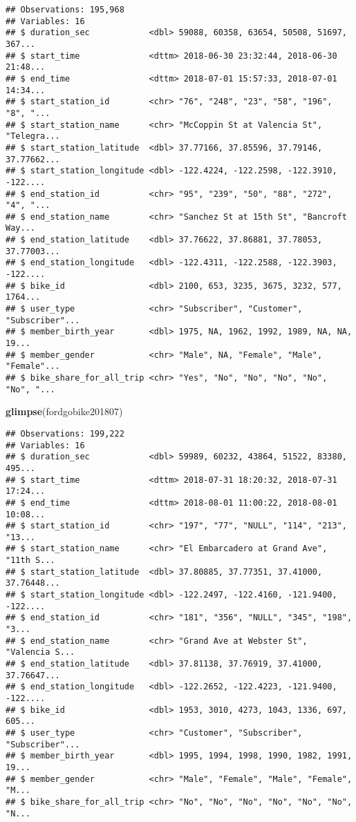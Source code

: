 \documentclass[]{article}
\newenvironment{Shaded}{\begin{snugshade}}{\end{snugshade}}
\newcommand{\KeywordTok}[1]{\textcolor[rgb]{0.13,0.29,0.53}{\textbf{#1}}}
\newcommand{\NormalTok}[1]{#1}
\begin{document}
\begin{verbatim}
## Observations: 195,968
## Variables: 16
## $ duration_sec            <dbl> 59088, 60358, 63654, 50508, 51697, 367...
## $ start_time              <dttm> 2018-06-30 23:32:44, 2018-06-30 21:48...
## $ end_time                <dttm> 2018-07-01 15:57:33, 2018-07-01 14:34...
## $ start_station_id        <chr> "76", "248", "23", "58", "196", "8", "...
## $ start_station_name      <chr> "McCoppin St at Valencia St", "Telegra...
## $ start_station_latitude  <dbl> 37.77166, 37.85596, 37.79146, 37.77662...
## $ start_station_longitude <dbl> -122.4224, -122.2598, -122.3910, -122....
## $ end_station_id          <chr> "95", "239", "50", "88", "272", "4", "...
## $ end_station_name        <chr> "Sanchez St at 15th St", "Bancroft Way...
## $ end_station_latitude    <dbl> 37.76622, 37.86881, 37.78053, 37.77003...
## $ end_station_longitude   <dbl> -122.4311, -122.2588, -122.3903, -122....
## $ bike_id                 <dbl> 2100, 653, 3235, 3675, 3232, 577, 1764...
## $ user_type               <chr> "Subscriber", "Customer", "Subscriber"...
## $ member_birth_year       <dbl> 1975, NA, 1962, 1992, 1989, NA, NA, 19...
## $ member_gender           <chr> "Male", NA, "Female", "Male", "Female"...
## $ bike_share_for_all_trip <chr> "Yes", "No", "No", "No", "No", "No", "...
\end{verbatim}

\begin{Shaded}
\begin{Highlighting}[]
\KeywordTok{glimpse}\NormalTok{(fordgobike201807)}
\end{Highlighting}
\end{Shaded}

\begin{verbatim}
## Observations: 199,222
## Variables: 16
## $ duration_sec            <dbl> 59989, 60232, 43864, 51522, 83380, 495...
## $ start_time              <dttm> 2018-07-31 18:20:32, 2018-07-31 17:24...
## $ end_time                <dttm> 2018-08-01 11:00:22, 2018-08-01 10:08...
## $ start_station_id        <chr> "197", "77", "NULL", "114", "213", "13...
## $ start_station_name      <chr> "El Embarcadero at Grand Ave", "11th S...
## $ start_station_latitude  <dbl> 37.80885, 37.77351, 37.41000, 37.76448...
## $ start_station_longitude <dbl> -122.2497, -122.4160, -121.9400, -122....
## $ end_station_id          <chr> "181", "356", "NULL", "345", "198", "3...
## $ end_station_name        <chr> "Grand Ave at Webster St", "Valencia S...
## $ end_station_latitude    <dbl> 37.81138, 37.76919, 37.41000, 37.76647...
## $ end_station_longitude   <dbl> -122.2652, -122.4223, -121.9400, -122....
## $ bike_id                 <dbl> 1953, 3010, 4273, 1043, 1336, 697, 605...
## $ user_type               <chr> "Customer", "Subscriber", "Subscriber"...
## $ member_birth_year       <dbl> 1995, 1994, 1998, 1990, 1982, 1991, 19...
## $ member_gender           <chr> "Male", "Female", "Male", "Female", "M...
## $ bike_share_for_all_trip <chr> "No", "No", "No", "No", "No", "No", "N...
\end{verbatim}
\end{document}
